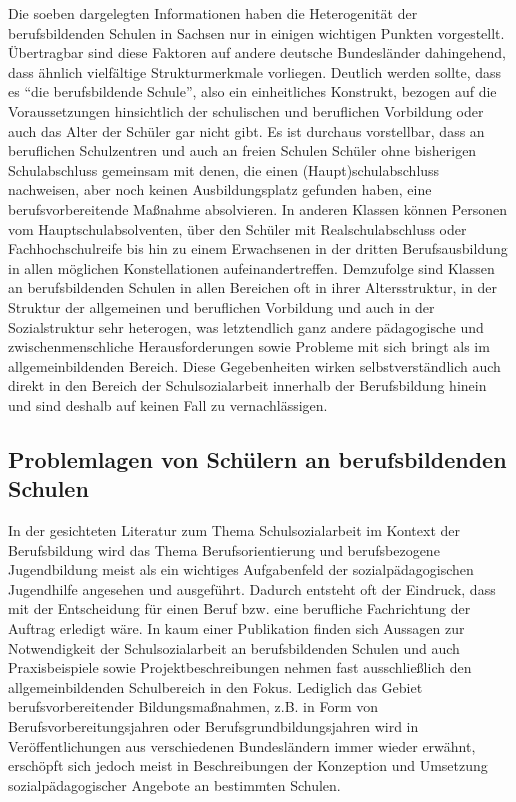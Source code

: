 Die soeben dargelegten Informationen haben die Heterogenität der berufsbildenden Schulen in Sachsen nur in einigen wichtigen Punkten vorgestellt. Übertragbar sind diese Faktoren auf andere deutsche Bundesländer dahingehend, dass ähnlich vielfältige Strukturmerkmale vorliegen. Deutlich werden sollte, dass es "`die berufsbildende Schule"', also ein einheitliches Konstrukt, bezogen auf die Voraussetzungen hinsichtlich der schulischen und beruflichen Vorbildung oder auch das Alter der Schüler gar nicht gibt. Es ist durchaus vorstellbar, dass an beruflichen Schulzentren und auch an freien Schulen Schüler ohne bisherigen Schulabschluss gemeinsam mit denen, die einen (Haupt)schulabschluss nachweisen, aber noch keinen Ausbildungsplatz gefunden haben, eine berufsvorbereitende Maßnahme absolvieren. In anderen Klassen können Personen vom Hauptschulabsolventen, über den Schüler mit Realschulabschluss oder Fachhochschulreife bis hin zu einem Erwachsenen in der dritten Berufsausbildung in allen möglichen Konstellationen aufeinandertreffen. Demzufolge sind Klassen an berufsbildenden Schulen in allen Bereichen oft in ihrer Altersstruktur, in der Struktur der allgemeinen und beruflichen Vorbildung und auch in der Sozialstruktur sehr heterogen, was letztendlich ganz andere pädagogische und zwischenmenschliche Herausforderungen sowie Probleme mit sich bringt als im allgemeinbildenden Bereich. Diese Gegebenheiten wirken selbstverständlich auch direkt in den Bereich der Schulsozialarbeit innerhalb der Berufsbildung hinein und sind deshalb auf keinen Fall zu vernachlässigen.

\subsection{Problemlagen von Schülern an berufsbildenden Schulen}
\label{sec:ProblemlagenVonSchülernAnBerufsbildendenSchulen}

In der gesichteten Literatur zum Thema Schulsozialarbeit im Kontext der Berufsbildung wird das Thema Berufsorientierung und berufsbezogene Jugendbildung meist als ein wichtiges Aufgabenfeld der sozialpädagogischen Jugendhilfe angesehen und ausgeführt. Dadurch entsteht oft der Eindruck, dass mit der Entscheidung für einen Beruf bzw. eine berufliche Fachrichtung der Auftrag erledigt wäre. In kaum einer Publikation finden sich Aussagen zur Notwendigkeit der Schulsozialarbeit an berufsbildenden Schulen und auch Praxisbeispiele sowie Projektbeschreibungen nehmen fast ausschließlich den allgemeinbildenden Schulbereich in den Fokus. Lediglich das Gebiet berufsvorbereitender Bildungsmaßnahmen, z.B. in Form von Berufsvorbereitungsjahren oder Berufsgrundbildungsjahren wird in Veröffentlichungen aus verschiedenen Bundesländern immer wieder erwähnt, erschöpft sich jedoch meist in Beschreibungen der Konzeption und Umsetzung sozialpädagogischer Angebote an bestimmten Schulen.

